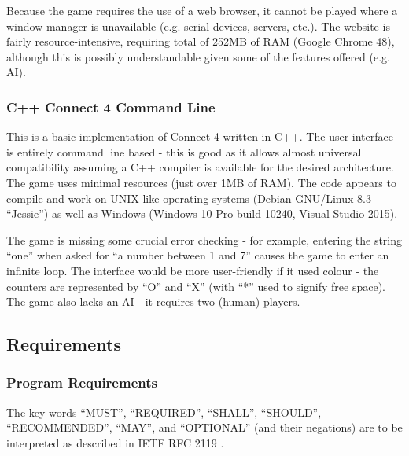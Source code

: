 \documentclass[11pt,onecolumn]{article}
\begin{document}
Because the game requires the use of a web browser, it cannot be played where a window manager is unavailable (e.g. serial devices, servers, etc.). The website is fairly resource-intensive, requiring  total of 252MB of RAM (Google Chrome 48), although this is possibly understandable given some of the features offered (e.g. AI).

\subsubsection{C++ Connect 4 Command Line \cite{MichaelEstesCPPC4Cmd}}

This is a basic implementation of Connect 4 written in C++. The user interface is entirely command line based - this is good as it allows almost universal compatibility assuming a C++ compiler is available for the desired architecture. The game uses minimal resources (just over 1MB of RAM). The code appears to compile and work on UNIX-like operating systems (Debian GNU/Linux 8.3 ``Jessie'') as well as Windows (Windows 10 Pro build 10240, Visual Studio 2015).

The game is missing some crucial error checking - for example, entering the string ``one'' when asked for ``a number between 1 and 7'' causes the game to enter an infinite loop. The interface would be more user-friendly if it used colour - the counters are represented by ``O'' and ``X'' (with ``*'' used to signify free space). The game also lacks an AI - it requires two (human) players.

\subsection{Requirements}



\subsubsection{Program Requirements}

The key words ``MUST'', ``REQUIRED'', ``SHALL'', ``SHOULD'', ``RECOMMENDED'', ``MAY'', and ``OPTIONAL'' (and their negations) are to be interpreted as described in IETF RFC 2119 \cite{IETFRequirementLevels}.
\end{document}
